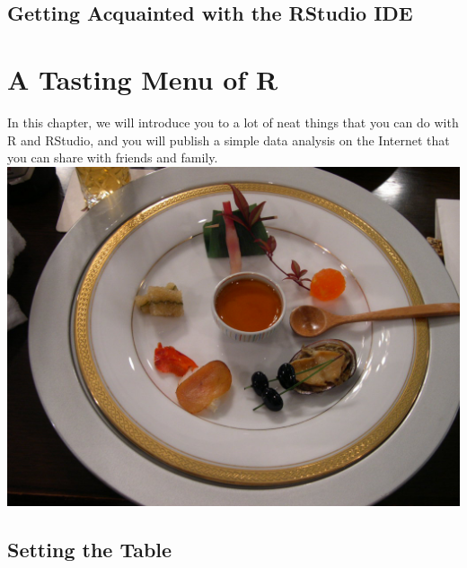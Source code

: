\documentclass[
]{book}
\begin{document}
\hypertarget{getting-acquainted-with-the-rstudio-ide}{%
\section{Getting Acquainted with the RStudio IDE}\label{getting-acquainted-with-the-rstudio-ide}}

\hypertarget{a-tasting-menu-of-r}{%
\chapter{A Tasting Menu of R}\label{a-tasting-menu-of-r}}

In this chapter, we will introduce you to a lot of neat things that you can do with R and RStudio, and you will publish a simple data analysis on the Internet
that you can share with friends and family.
\includegraphics{images/tasting.png}

\hypertarget{setting-the-table}{%
\section{Setting the Table}\label{setting-the-table}}
\end{document}
